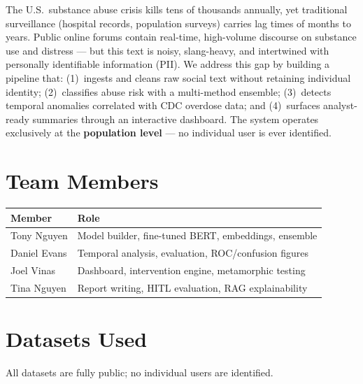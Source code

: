 \documentclass[10pt,twocolumn]{article}
\begin{document}
The U.S.\ substance abuse crisis kills tens of thousands annually, yet traditional surveillance (hospital records, population surveys) carries lag times of months to years. Public online forums contain real-time, high-volume discourse on substance use and distress — but this text is noisy, slang-heavy, and intertwined with personally identifiable information (PII). We address this gap by building a pipeline that: (1)~ingests and cleans raw social text without retaining individual identity; (2)~classifies abuse risk with a multi-method ensemble; (3)~detects temporal anomalies correlated with CDC overdose data; and (4)~surfaces analyst-ready summaries through an interactive dashboard. The system operates exclusively at the \textbf{population level} — no individual user is ever identified.

\section{Team Members}

\begin{tabularx}{\columnwidth}{@{}lX@{}}
  \toprule
  \textbf{Member} & \textbf{Role} \\
  \midrule
  Tony Nguyen  & Model builder, fine-tuned BERT, embeddings, ensemble \\
  Daniel Evans & Temporal analysis, evaluation, ROC/confusion figures \\
  Joel Vinas   & Dashboard, intervention engine, metamorphic testing \\
  Tina Nguyen  & Report writing, HITL evaluation, RAG explainability \\
  \bottomrule
\end{tabularx}

\section{Datasets Used}

All datasets are fully public; no individual users are identified.
\end{document}
